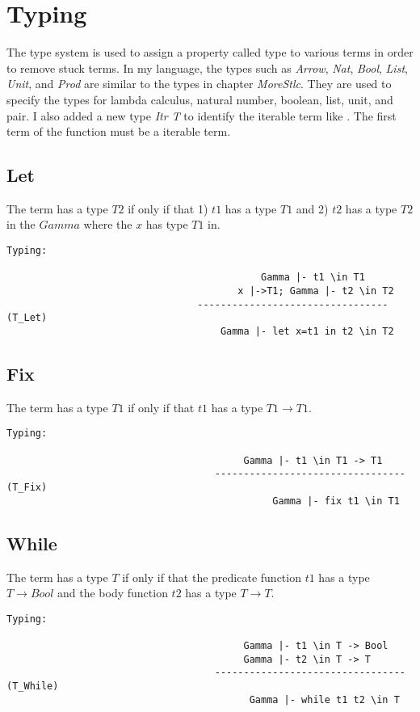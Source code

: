 \section{Typing}
\label{sec:type}
The type system is used to assign a property called type to various terms in order to remove stuck terms. 
In my language, the types such as \textit{Arrow}, \textit{Nat}, \textit{Bool}, \textit{List}, \textit{Unit}, and \textit{Prod} are similar to the types in chapter \textit{MoreStlc}.
They are used to specify the types for lambda calculus, natural number, boolean, list, unit, and pair.
I also added a new type \textit{Itr T} to identify the iterable term like \gen. 
The first term of the \nt function must be a iterable term.


\subsection{Let}
The \lt term has a type $T2$  if only if that 1) $t1$ has a type $T1$ and 2) $t2$ has a type $T2$ in the $Gamma$ where the $x$ has type $T1$ in.
\begin{lstlisting}
Typing:

											Gamma |- t1 \in T1
										x |->T1; Gamma |- t2 \in T2
								 ---------------------------------   (T_Let)
									 Gamma |- let x=t1 in t2 \in T2
\end{lstlisting}

\subsection{Fix}
The \fix term has a type $T1$ if only if that $t1$ has a type $T1 \rightarrow T1$.
\begin{lstlisting}
Typing:

									     Gamma |- t1 \in T1 -> T1
									---------------------------------   (T_Fix)
									 		  Gamma |- fix t1 \in T1
\end{lstlisting}

\subsection{While}
The \while term has a type $T$ if only if that the predicate function $t1$ has a type $T \rightarrow Bool$ and the body function $t2$ has a type $T \rightarrow T$.
\begin{lstlisting}
Typing:

									     Gamma |- t1 \in T -> Bool
									     Gamma |- t2 \in T -> T
									---------------------------------   (T_While)
										  Gamma |- while t1 t2 \in T
\end{lstlisting}


